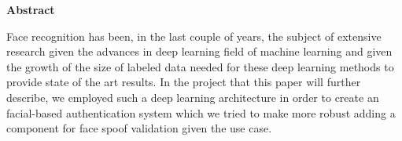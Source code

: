\thispagestyle{plain}

\vspace*{\fill}

\begin{center}
	\Large \textbf{Abstract}	
\end{center}

Face recognition has been, in the last couple of years, the subject of extensive research given the advances in deep learning field of machine learning and given the growth of the size of labeled data needed for these deep learning methods to provide state of the art results. In the project that this paper will further describe, we employed such a deep learning architecture in order to create an facial-based authentication system which we tried to make more robust adding a component for face spoof validation given the use case.

\vspace*{\fill}
